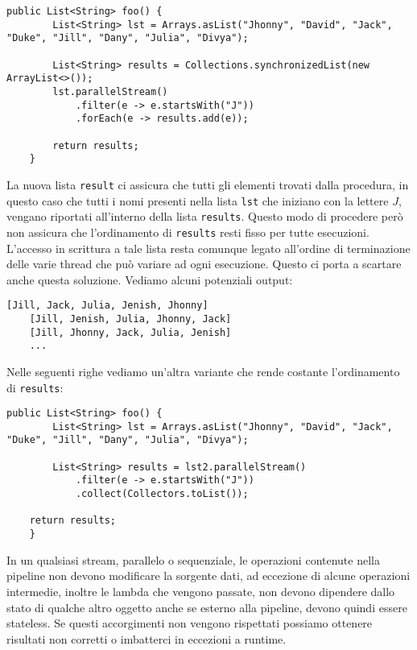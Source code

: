 			\begin{lstlisting}[breaklines=true]
	public List<String> foo() {
		List<String> lst = Arrays.asList("Jhonny", "David", "Jack", "Duke", "Jill", "Dany", "Julia", "Divya");
		
		List<String> results = Collections.synchronizedList(new ArrayList<>());
		lst.parallelStream()
			.filter(e -> e.startsWith("J"))
			.forEach(e -> results.add(e));
		
		return results;
	}
			\end{lstlisting}
			La nuova lista \lstinline|result| ci assicura che tutti gli elementi trovati dalla procedura, in questo caso che tutti i nomi presenti nella lista \lstinline|lst| che iniziano con la lettere $J$, vengano riportati all'interno della lista \lstinline|results|. Questo modo di procedere però non assicura che l'ordinamento di \lstinline|results| resti fisso per tutte esecuzioni. L'accesso in scrittura a tale lista resta comunque legato all'ordine di terminazione delle varie thread che può variare ad ogni esecuzione. Questo ci porta a scartare anche questa soluzione. Vediamo alcuni potenziali output:
			\begin{lstlisting}[numbers=none,frame=none]
	[Jill, Jack, Julia, Jenish, Jhonny]
	[Jill, Jenish, Julia, Jhonny, Jack]
	[Jill, Jhonny, Jack, Julia, Jenish]
	...
			\end{lstlisting}
			Nelle seguenti righe vediamo un'altra variante che rende costante l'ordinamento di \lstinline|results|:
			\begin{lstlisting}[breaklines=true]
	public List<String> foo() {
		List<String> lst = Arrays.asList("Jhonny", "David", "Jack", "Duke", "Jill", "Dany", "Julia", "Divya");
	
		List<String> results = lst2.parallelStream()
			.filter(e -> e.startsWith("J"))
			.collect(Collectors.toList());
	
	return results;
	}
			\end{lstlisting}
			In un qualsiasi stream, parallelo o sequenziale, le operazioni contenute nella pipeline non devono modificare la sorgente dati, ad eccezione di alcune operazioni intermedie, inoltre le lambda che vengono passate, non devono dipendere dallo stato di qualche altro oggetto anche se esterno alla pipeline, devono quindi essere stateless. Se questi accorgimenti non vengono rispettati possiamo ottenere risultati non corretti o imbatterci in eccezioni a runtime.
			
